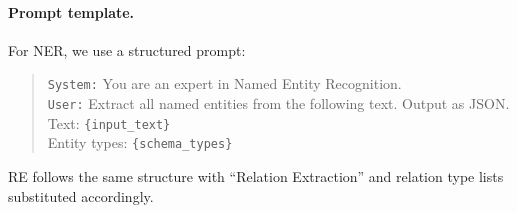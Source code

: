 \begin{table}[t]
\centering
\small
\caption{Training configuration. Both Qwen3-8B and LLaMA-3.1-8B-Instruct use identical settings unless noted.}
\label{tab:training}
\end{table}

\paragraph{Prompt template.}
For NER, we use a structured prompt:
\begin{quote}
\small
\texttt{System:} You are an expert in Named Entity Recognition.\\
\texttt{User:} Extract all named entities from the following text. Output as JSON.\\
Text: \texttt{\{input\_text\}}\\
Entity types: \texttt{\{schema\_types\}}
\end{quote}
RE follows the same structure with ``Relation Extraction'' and relation type lists substituted accordingly.

